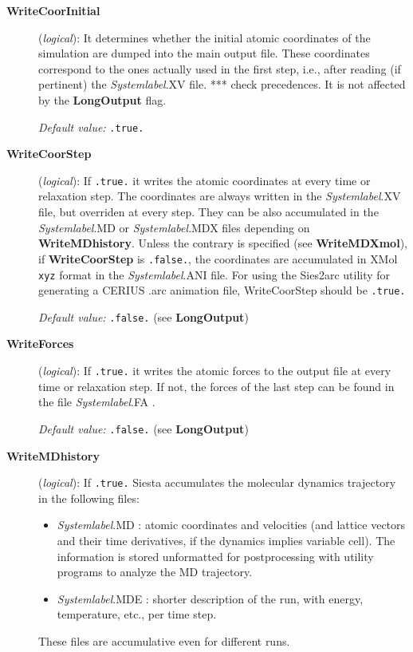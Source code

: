 \documentclass[11pt]{article}
\begin{document}
\begin{description}
\item[{\bf WriteCoorInitial}] ({\it logical}):
It determines whether the initial atomic coordinates of the simulation are
dumped into the main output file. These coordinates correspond to the
ones actually used in the first step, i.e., after reading (if pertinent)
the {\it Systemlabel}.XV file. *** check precedences. 
It is not affected by the {\bf LongOutput} flag.

{\it Default value:} {\tt .true.}

 
\item[{\bf WriteCoorStep}] ({\it logical}):
If {\tt .true.} it writes the atomic coordinates at every 
time or relaxation step. The coordinates are
always written in the {\it Systemlabel}.XV file, but
overriden at every step. They can be also accumulated
in the {\it Systemlabel}.MD or {\it Systemlabel}.MDX files
depending on {\bf WriteMDhistory}. Unless the contrary is specified
(see {\bf WriteMDXmol}), if {\bf WriteCoorStep} is {\tt .false.}, 
the coordinates are accumulated in {\sc XMol} {\tt xyz} format in the
{\it Systemlabel}.ANI file.
For using the {\sc Sies2arc} utility
for generating a CERIUS .arc animation file,
WriteCoorStep should be {\tt .true.}

{\it Default value:} {\tt .false.} (see {\bf LongOutput})
 
 
\item[{\bf WriteForces}] ({\it logical}):  If {\tt .true.} it writes the
  atomic forces to the output file at every time or relaxation
  step. If not, the forces of the last step can be found in the file
  {\it Systemlabel}.FA .
 
{\it Default value:} {\tt .false.} (see {\bf LongOutput})

\item[{\bf WriteMDhistory}] ({\it logical}):
If {\tt .true.} {\sc Siesta} accumulates the molecular dynamics
trajectory in the following files:
\begin{itemize}
\item
{\it Systemlabel}.MD : atomic coordinates and velocities (and
lattice vectors and their time derivatives, if the dynamics implies
variable cell). The information is stored unformatted for postprocessing
with utility programs to analyze the MD trajectory. 
\item
{\it Systemlabel}.MDE : shorter description of the run, with energy,
temperature, etc., per time step.
\end{itemize}
These files are accumulative even for different runs.
 

\end{description}
\end{document}

